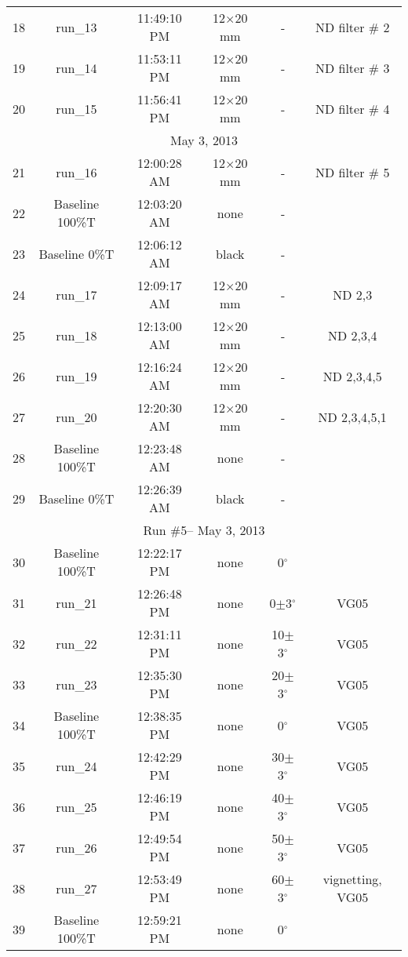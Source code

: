 \begin{center}
\begin{longtable}{c c c c c  c}
      18 & run\_13 &   11:49:10 PM  & 12$\times$20 mm & - & ND filter \# 2\\
      19 & run\_14 &   11:53:11 PM  & 12$\times$20 mm & - & ND filter \# 3\\
      20 & run\_15 &   11:56:41 PM  & 12$\times$20 mm & - & ND filter \# 4\\
              \hline
       \multicolumn{6}{c}{May 3, 2013} \\
               \hline
      21 & run\_16 &   12:00:28 AM  & 12$\times$20 mm & - & ND filter \# 5\\
      22 & Baseline 100\%T &   12:03:20 AM  & none & - & \\
      23 & Baseline 0\%T &   12:06:12 AM  & black & - & \\
      24 & run\_17 &   12:09:17 AM  & 12$\times$20 mm & - & ND 2,3\\
      25 & run\_18 &   12:13:00 AM  & 12$\times$20 mm & - & ND 2,3,4\\
      26 & run\_19 &   12:16:24 AM  & 12$\times$20 mm & - & ND 2,3,4,5\\
      27 & run\_20 &   12:20:30 AM  & 12$\times$20 mm & - & ND 2,3,4,5,1\\
      28 & Baseline 100\%T &   12:23:48 AM  & none & - & \\
      29 & Baseline 0\%T &   12:26:39 AM  & black & - & \\
      \hline
       \multicolumn{6}{c}{Run \#5-- May 3, 2013} \\
      \hline
      30 & Baseline 100\%T &    12:22:17 PM & none & 0$^{\circ}$& \\
      31 & run\_21 &    12:26:48 PM & none & 0$\pm$3$^{\circ}$& VG05\\
      32 & run\_22 &    12:31:11 PM & none & 10$\pm$3$^{\circ}$ & VG05\\
      33 & run\_23 &    12:35:30 PM & none & 20$\pm$3$^{\circ}$ & VG05\\
      34 & Baseline 100\%T &    12:38:35 PM & none & 0$^{\circ}$& VG05\\
      35 & run\_24 &    12:42:29 PM & none & 30$\pm$3$^{\circ}$& VG05\\
      36 & run\_25 &    12:46:19 PM & none & 40$\pm$3$^{\circ}$ & VG05\\
      37 & run\_26 &    12:49:54 PM & none & 50$\pm$3$^{\circ}$ & VG05\\
      38 & run\_27 &    12:53:49 PM & none & 60$\pm$3$^{\circ}$ & vignetting, VG05\\
      39 & Baseline 100\%T &    12:59:21 PM & none &0$^{\circ}$ & \\

\end{longtable}
\end{center}

